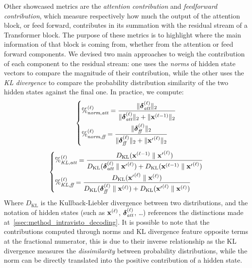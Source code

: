 Other showcased metrics are the \emph{attention contribution} and \emph{feedforward contribution}, which measure respectively how much the output of the attention block, or feed forward, contributes in its summation with the residual stream of a Transformer block.
The purpose of these metrics is to highlight where the main information of that block is coming from, whether from the attention or feed forward components.
We devised two main approaches to weigh the contribution of each component to the residual stream: one uses the \emph{norms} of hidden state vectors to compare the magnitude of their contribution, while the other uses the \emph{KL divergence} to compare the probability distribution similarity of the two hidden states against the final one.
In practice, we compute:
\begin{equation}
    \left\{
    \begin{aligned}
        &{\%}^{(\ell)}_{\textit{norm},\textit{att}} = \frac{\|\bm{\mathbf{\delta}}_\textit{att}^{(\ell)}\|_2}{\|\bm{\mathbf{\delta}}_\textit{att}^{(\ell)}\|_2 + \|\bm{\mathbf{x}}^{(\ell-1)}\|_2} \\
        &{\%}^{(\ell)}_{\textit{norm},\textit{ff}} = \frac{\|\bm{\mathbf{\delta}}_\textit{ff}^{(\ell)}\|_2}{\|\bm{\mathbf{\delta}}_\textit{ff}^{(\ell)}\|_2 + \|{\bm{\mathbf{x}}'}^{(\ell)}\|_2} \label{eq:method_intravisto_norm-contrib}
    \end{aligned}
    \right.
\end{equation}
\begin{equation}
    \left\{
    \begin{aligned}
        &{\%}^{(\ell)}_{\textit{KL},\textit{att}} = \frac{D_{\text{KL}}(\bm{\mathbf{x}}^{(\ell-1)} \parallel {\bm{\mathbf{x}}'}^{(\ell)})}{D_{\text{KL}}(\bm{\mathbf{\delta}}_\textit{att}^{(\ell)} \parallel {\bm{\mathbf{x}}'}^{(\ell)}) + D_{\text{KL}}(\bm{\mathbf{x}}^{(\ell-1)} \parallel {\bm{\mathbf{x}}'}^{(\ell)})} \\
        &{\%}^{(\ell)}_{\textit{KL},\textit{ff}} = \frac{D_{\text{KL}}({\bm{\mathbf{x}}'}^{(\ell)} \parallel \bm{\mathbf{x}}^{(\ell)})}{D_{\text{KL}}(\bm{\mathbf{\delta}}_\textit{ff}^{(\ell)} \parallel \bm{\mathbf{x}}^{(\ell)}) + D_{\text{KL}}({\bm{\mathbf{x}}'}^{(\ell)} \parallel \bm{\mathbf{x}}^{(\ell)})} \label{eq:method_intravisto_kl-contrib}
    \end{aligned}
    \right.
\end{equation}
Where $D_{\text{KL}}$ is the Kullback-Liebler divergence between two distributions, and the notation of hidden states (such as $\bm{\mathbf{x}}^{(\ell)}$, $\bm{\mathbf{\delta}}_\textit{att}^{(\ell)}$, \ldots) references the distinctions made at~\cref{ssec:method_intravisto_decoding}.
It is possible to note that the contributions computed through norms and KL divergence feature opposite terms at the fractional numerator, this is due to their inverse relationship as the KL divergence measures the \emph{dissimilarity} between probability distributions, while the norm can be directly translated into the positive contribution of a hidden state. 

